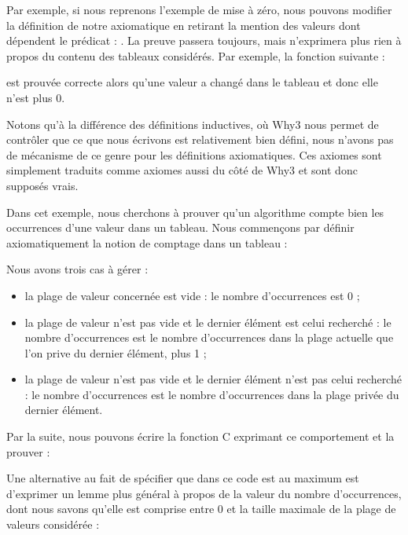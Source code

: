 Par exemple, si nous reprenons l'exemple de mise à zéro, nous pouvons modifier
la définition de notre axiomatique en retirant la mention des valeurs dont
dépendent le prédicat : . La preuve passera toujours,
mais n'exprimera plus rien à propos du contenu des tableaux considérés.
Par exemple, la fonction suivante :




est prouvée correcte alors qu'une valeur a changé dans le tableau et donc elle
n'est plus 0.


Notons qu'à la différence des définitions inductives, où Why3 nous permet de contrôler
que ce que nous écrivons est relativement bien défini, nous n'avons pas de mécanisme
de ce genre pour les définitions axiomatiques. Ces axiomes sont simplement traduits
comme axiomes aussi du côté de Why3 et sont donc supposés vrais.




Dans cet exemple, nous cherchons à prouver qu'un algorithme compte bien les
occurrences d'une valeur dans un tableau. Nous commençons par définir
axiomatiquement la notion de comptage dans un tableau :





Nous avons trois cas à gérer :



\begin{itemize}
\item la plage de valeur concernée est vide : le nombre d'occurrences est 0 ;
\item la plage de valeur n'est pas vide et le dernier élément est celui recherché :
le nombre d'occurrences est le nombre d'occurrences dans la plage actuelle que
l'on prive du dernier élément, plus 1 ;
\item la plage de valeur n'est pas vide et le dernier élément n'est pas celui
recherché : le nombre d'occurrences est le nombre d'occurrences dans la plage
privée du dernier élément.
\end{itemize}


Par la suite, nous pouvons écrire la fonction C exprimant ce comportement et la
prouver :






Une alternative au fait de spécifier que dans ce code  est au
maximum  est d'exprimer un lemme plus général à propos de la valeur
du nombre d'occurrences, dont nous savons qu'elle est comprise entre 0 et
la taille maximale de la plage de valeurs considérée :



